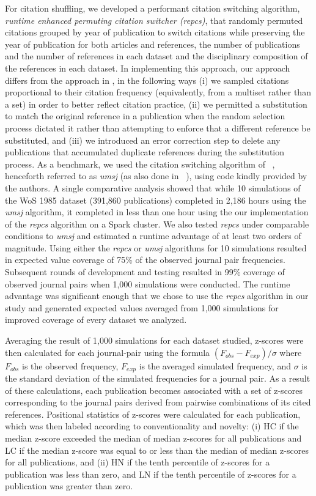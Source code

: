 \documentclass[NETN]{stjour}
\begin{document}
For citation shuffling, we developed a performant citation switching algorithm, \emph{runtime enhanced permuting citation switcher (repcs)}, that randomly permuted citations grouped by year of publication to switch citations while preserving the year of publication for both articles and references, the number of publications and the number of references in each dataset and the disciplinary composition of the references in each dataset. In implementing this approach, our approach differs from the approach in \cite{uzzi_atypical_2013}, in the following ways (i) we sampled citations proportional to their citation frequency (equivalently, from a multiset rather than a set) in order to better reflect citation practice,  (ii) we permitted a substitution to match the original reference in a publication when the random selection process dictated it rather than attempting to enforce that a different reference be substituted, and (iii) we introduced an error correction step to delete any publications that accumulated duplicate references during the substitution process. 
As a benchmark, we used the citation switching algorithm of ~\cite{uzzi_atypical_2013}, henceforth referred to  as \emph{umsj} (as also done in ~\cite{boyack_vs_uzzi_2014}), using code kindly provided by the authors. A single comparative analysis showed that while 10 simulations of the WoS 1985 dataset (391,860 publications) completed in 2,186 hours using the \emph{umsj} algorithm, it completed in less than one hour using the our implementation of the \emph{repcs}   algorithm on a Spark  cluster. We also tested \emph{repcs}  under comparable conditions to \emph{umsj} and estimated a runtime advantage of at least two orders of magnitude. Using either the \emph{repcs}   or \emph{umsj} algorithms for 10 simulations resulted in expected value coverage of 75\% of the observed journal pair frequencies. Subsequent rounds of development and testing resulted in 99\% coverage of observed journal pairs when 1,000 simulations were conducted. The runtime advantage was significant enough that we chose to use the \emph{repcs}   algorithm in our study  and generated expected values averaged from 1,000 simulations for improved coverage of every dataset we analyzed. 

Averaging the result of 1,000 simulations for each dataset studied, z-scores were then calculated for each journal-pair using the formula $(F_{obs} - F_{exp})/\sigma$ where $F_{obs}$ is the observed frequency, $F_{exp}$ is the averaged simulated frequency, and $\sigma$ is the standard deviation of the simulated frequencies for a journal pair. As a result of these calculations, each publication becomes associated with a set of z-scores corresponding to the journal pairs derived from pairwise combinations of its cited references. Positional statistics of z-scores were calculated for each publication, which was then labeled according to conventionality and novelty: (i) HC if the median z-score exceeded the median of median z-scores for all publications and LC if the median z-score was equal to or less than the median of median z-scores for all publications, and (ii) HN if the tenth percentile of z-scores for a publication was less than zero, and LN if the tenth percentile of z-scores for a publication was greater than zero.  
\end{document}
